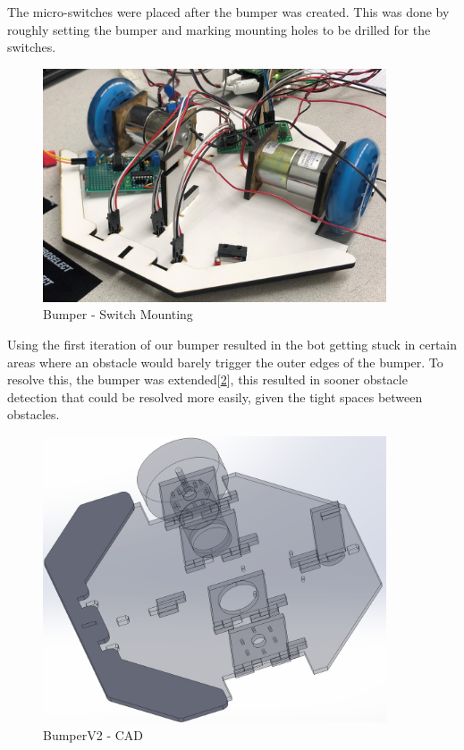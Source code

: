 \documentclass{article}
\begin{document}
The micro-switches were placed after the bumper was created. This was done by roughly setting the bumper and marking mounting holes to be drilled for the switches.

\begin{figure}[H]
    \centering
    \includegraphics[width = 4in]{BumperSwitches.JPG}
    \caption{Bumper - Switch Mounting}
    \label{fig:BumperSwitches}
\end{figure}

Using the first iteration of our bumper resulted in the bot getting stuck in certain areas where an obstacle would barely trigger the outer edges of the bumper. To resolve this, the bumper was extended[\ref{fig:BumperV2CAD}], this resulted in sooner obstacle detection that could be resolved more easily, given the tight spaces between obstacles.


\begin{figure}[H]
    \centering
    \includegraphics[width =4in]{BumperV2.PNG}
    \caption{BumperV2 - CAD}
    \label{fig:BumperV2CAD}
\end{figure}
\end{document}
